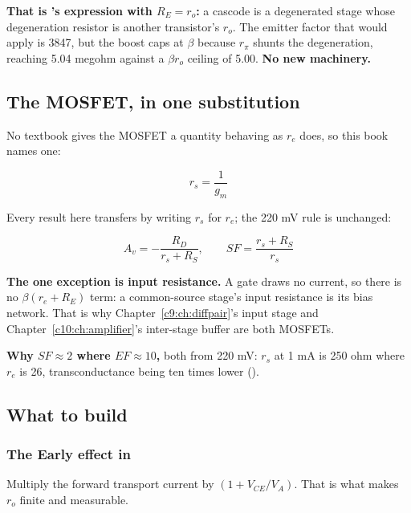 \textbf{That is 's expression with $R_E = r_o$:} a cascode is a degenerated stage whose degeneration resistor is another transistor's $r_o$. The emitter factor that would apply is 3847, but the boost caps at $\beta$ because $r_\pi$ shunts the degeneration, reaching 5.04 megohm against a $\beta r_o$ ceiling of 5.00. \textbf{No new machinery.}

\subsection{The MOSFET, in one substitution}
\label{c7:sec:b6}
No textbook gives the MOSFET a quantity behaving as $r_e$ does, so this book names one:

\[
  r_s = \frac{1}{g_m}
\]


Every result here transfers by writing $r_s$ for $r_e$; the 220 mV rule is unchanged:

\[
  A_v = -\frac{R_D}{r_s + R_S}, \qquad SF = \frac{r_s + R_S}{r_s}
\]

\textbf{The one exception is input resistance.} A gate draws no current, so there is no $\beta(r_e + R_E)$ term: a common-source stage's input resistance is its bias network. That is why Chapter~\ref{c9:ch:diffpair}'s input stage and Chapter~\ref{c10:ch:amplifier}'s inter-stage buffer are both MOSFETs.

\textbf{Why $SF \approx 2$ where $EF \approx 10$,} both from 220 mV: $r_s$ at 1 mA is 250 ohm where $r_e$ is 26, transconductance being ten times lower ().

\subsection{What to build}
\label{c7:sec:b7}

\subsubsection{The Early effect in }
Multiply the forward transport current by $(1 + V_{CE}/V_A)$. That is what makes $r_o$ finite and  measurable.

